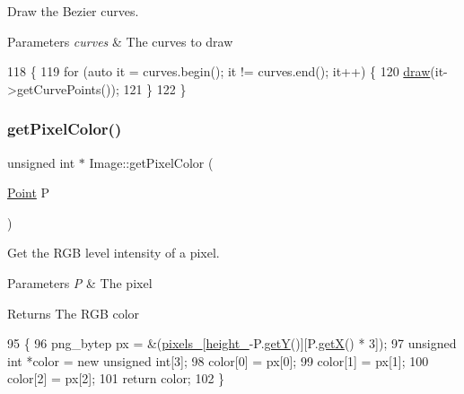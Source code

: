 Draw the Bezier curves. 


\begin{DoxyParams}{Parameters}
{\em curves} & The curves to draw \\
\hline
\end{DoxyParams}

\begin{DoxyCode}
118                                               \{
119     \textcolor{keywordflow}{for} (\textcolor{keyword}{auto} it = curves.begin(); it != curves.end(); it++) \{
120         \mbox{\hyperlink{class_image_a8d162f3cab956131d58708c09aa560b0}{draw}}(it->getCurvePoints());
121     \} 
122 \}
\end{DoxyCode}
\mbox{\label{class_image_adb23176701dae47479d4919f55f3aec5}} 
\subsubsection{\texorpdfstring{get\+Pixel\+Color()}{getPixelColor()}}
{\footnotesize\ttfamily unsigned int $\ast$ Image\+::get\+Pixel\+Color (\begin{DoxyParamCaption}\item[{\mbox{\hyperlink{class_point}{Point}}}]{P }\end{DoxyParamCaption})}



Get the R\+GB level intensity of a pixel. 


\begin{DoxyParams}{Parameters}
{\em P} & The pixel \\
\hline
\end{DoxyParams}
\begin{DoxyReturn}{Returns}
The R\+GB color 
\end{DoxyReturn}

\begin{DoxyCode}
95                                           \{
96     png\_bytep px = \&(\mbox{\hyperlink{class_image_a51351c8507499d09cb9667c20ef01faf}{pixels\_}}[\mbox{\hyperlink{class_image_a64a699c5bb8e8a18c6971a8032806dba}{height\_}}-P.\mbox{\hyperlink{class_point_a86d10ff46e08462c45b15a8c7ef62d61}{getY}}()][P.\mbox{\hyperlink{class_point_ac9d5859db121c7d1b89ca89266dca0a3}{getX}}() * 3]);
97     \textcolor{keywordtype}{unsigned} \textcolor{keywordtype}{int} *color = \textcolor{keyword}{new} \textcolor{keywordtype}{unsigned} \textcolor{keywordtype}{int}[3];
98     color[0] = px[0];
99     color[1] = px[1];
100     color[2] = px[2];
101     \textcolor{keywordflow}{return} color;
102 \}
\end{DoxyCode}
\mbox{\label{class_image_a434149170df3e6fad24cc123c8ff029d}} 
